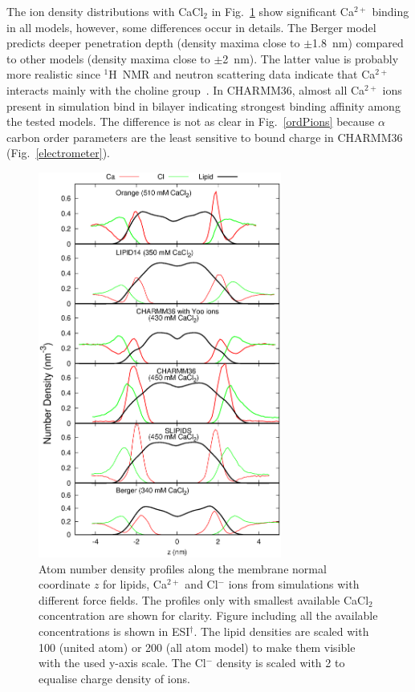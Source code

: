 \documentclass[twoside,twocolumn,9pt]{article}
\begin{document}
The ion density distributions with CaCl$_2$ in Fig.~\ref{CAdensitiesCLEAR} show significant
Ca$^{2+}$ binding in all models, however, some differences occur in details.
The Berger model predicts deeper penetration depth (density maxima close to $\pm$1.8~nm) compared
to other models (density maxima close to $\pm$2~nm). The latter value is probably more realistic 
since $^1$H~NMR and neutron scattering data indicate that Ca$^{2+}$ interacts mainly with the 
choline group~\cite{hauser76,hauser78,herbette84,cevc90}. In CHARMM36, almost all Ca$^{2+}$
ions present in simulation bind in bilayer indicating strongest binding affinity among the tested
models. The difference is not as clear in Fig.~\ref{ordPions} because $\alpha$ carbon order parameters 
are the least sensitive to bound charge in CHARMM36 (Fig.~\ref{electrometer}).
\begin{figure}[t]
  \centering
  \includegraphics[width=8cm]{../Fig/CAdensitiesCLEAR.eps}
  \caption{\label{CAdensitiesCLEAR}
    Atom number density profiles along the membrane normal coordinate $z$ for lipids, Ca$^{2+}$ and Cl$^-$ ions from simulations 
    with different force fields.
    The profiles only with smallest available CaCl$_2$ concentration are shown for clarity.
    Figure including all the available concentrations is shown in ESI$^\dag$.
    The lipid densities are scaled with 100 (united atom) or 200 (all atom model) to make them visible with the used y-axis scale.
    The Cl$^-$ density is scaled with 2 to equalise charge density of ions.
  }
\end{figure}
\end{document}
